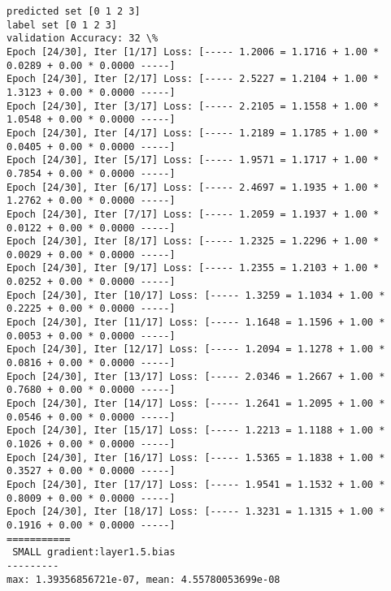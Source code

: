 \documentclass[11pt]{article}
\begin{document}
    \begin{Verbatim}[commandchars=\\\{\}]
predicted set [0 1 2 3]
label set [0 1 2 3]
validation Accuracy: 32 \%
Epoch [24/30], Iter [1/17] Loss: [----- 1.2006 = 1.1716 + 1.00 * 0.0289 + 0.00 * 0.0000 -----]
Epoch [24/30], Iter [2/17] Loss: [----- 2.5227 = 1.2104 + 1.00 * 1.3123 + 0.00 * 0.0000 -----]
Epoch [24/30], Iter [3/17] Loss: [----- 2.2105 = 1.1558 + 1.00 * 1.0548 + 0.00 * 0.0000 -----]
Epoch [24/30], Iter [4/17] Loss: [----- 1.2189 = 1.1785 + 1.00 * 0.0405 + 0.00 * 0.0000 -----]
Epoch [24/30], Iter [5/17] Loss: [----- 1.9571 = 1.1717 + 1.00 * 0.7854 + 0.00 * 0.0000 -----]
Epoch [24/30], Iter [6/17] Loss: [----- 2.4697 = 1.1935 + 1.00 * 1.2762 + 0.00 * 0.0000 -----]
Epoch [24/30], Iter [7/17] Loss: [----- 1.2059 = 1.1937 + 1.00 * 0.0122 + 0.00 * 0.0000 -----]
Epoch [24/30], Iter [8/17] Loss: [----- 1.2325 = 1.2296 + 1.00 * 0.0029 + 0.00 * 0.0000 -----]
Epoch [24/30], Iter [9/17] Loss: [----- 1.2355 = 1.2103 + 1.00 * 0.0252 + 0.00 * 0.0000 -----]
Epoch [24/30], Iter [10/17] Loss: [----- 1.3259 = 1.1034 + 1.00 * 0.2225 + 0.00 * 0.0000 -----]
Epoch [24/30], Iter [11/17] Loss: [----- 1.1648 = 1.1596 + 1.00 * 0.0053 + 0.00 * 0.0000 -----]
Epoch [24/30], Iter [12/17] Loss: [----- 1.2094 = 1.1278 + 1.00 * 0.0816 + 0.00 * 0.0000 -----]
Epoch [24/30], Iter [13/17] Loss: [----- 2.0346 = 1.2667 + 1.00 * 0.7680 + 0.00 * 0.0000 -----]
Epoch [24/30], Iter [14/17] Loss: [----- 1.2641 = 1.2095 + 1.00 * 0.0546 + 0.00 * 0.0000 -----]
Epoch [24/30], Iter [15/17] Loss: [----- 1.2213 = 1.1188 + 1.00 * 0.1026 + 0.00 * 0.0000 -----]
Epoch [24/30], Iter [16/17] Loss: [----- 1.5365 = 1.1838 + 1.00 * 0.3527 + 0.00 * 0.0000 -----]
Epoch [24/30], Iter [17/17] Loss: [----- 1.9541 = 1.1532 + 1.00 * 0.8009 + 0.00 * 0.0000 -----]
Epoch [24/30], Iter [18/17] Loss: [----- 1.3231 = 1.1315 + 1.00 * 0.1916 + 0.00 * 0.0000 -----]
===========
 SMALL gradient:layer1.5.bias
---------
max: 1.39356856721e-07, mean: 4.55780053699e-08

    \end{Verbatim}

    \begin{center}
    \end{center}
    { \hspace*{\fill} \\}
    
    \begin{center}
    \end{center}
    { \hspace*{\fill} \\}
    
\end{document}
